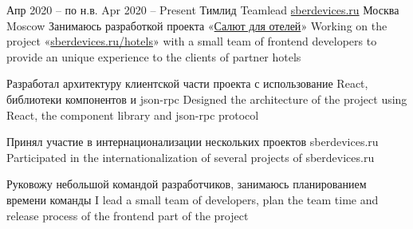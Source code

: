 \cventry
  {\lang
    {Апр 2020 – по н.в.}
    {Apr 2020 – Present}}
  {\lang
    {Тимлид}
    {Teamlead}}
  {\href{https://sberdevices.ru}{sberdevices.ru}}
  {\lang
    {Москва}
    {Moscow}}
  {}
  {\lang
    {Занимаюсь разработкой проекта «\href{https://sberdevices.ru/hotels/}{Салют для отелей}»}
    {Working on the project «\href{https://sberdevices.ru/hotels/}{sberdevices.ru/hotels}» with a small team of frontend developers to provide an unique experience to the clients of partner hotels}}

\cvlistitem
  {\lang
    {Разработал архитектуру клиентской части проекта с использование React, библиотеки компонентов и json-rpc}
    {Designed the architecture of the project using React, the component library and json-rpc protocol}}

\cvlistitem
  {\lang
    {Принял участие в интернационализации нескольких проектов sberdevices.ru}
    {Participated in the internationalization of several projects of sberdevices.ru}}

\cvlistitem
  {\lang
    {Руковожу небольшой командой разработчиков, занимаюсь планированием времени команды}
    {I lead a small team of developers, plan the team time and release process of the frontend part of the project}}
